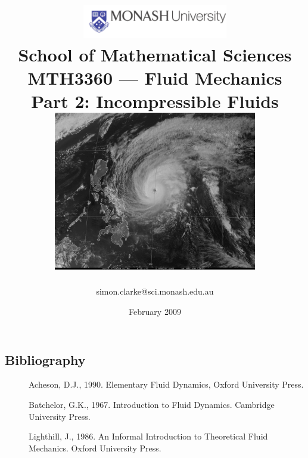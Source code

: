 \documentclass[twoside,a4paper,11pt]{report}
\begin{document}

\title{{\includegraphics[width=2.5in]{mlogo.pdf}}\\
\large{School of Mathematical Sciences}\\
\vfill
\Huge{MTH3360 --- Fluid Mechanics}\\
\Huge{Part 2: Incompressible Fluids}\\
\bigskip
\bigskip
{\includegraphics[width=3.5in]{Section2.pdf}}\\
\bigskip
\bigskip
}

\author{\Large{simon.clarke@sci.monash.edu.au}}
\date{\Large{February 2009}}

\maketitle

\newpage 
\subsection*{Bibliography}

\begin{description}
\item[]Acheson, D.J., 1990. Elementary Fluid Dynamics, Oxford University Press.

\item[]Batchelor, G.K., 1967. Introduction to Fluid Dynamics. Cambridge University 
Press.

\item[]Lighthill, J., 1986. An Informal Introduction to Theoretical Fluid 
Mechanics. Oxford University Press.
\end{description}
\end{document}

